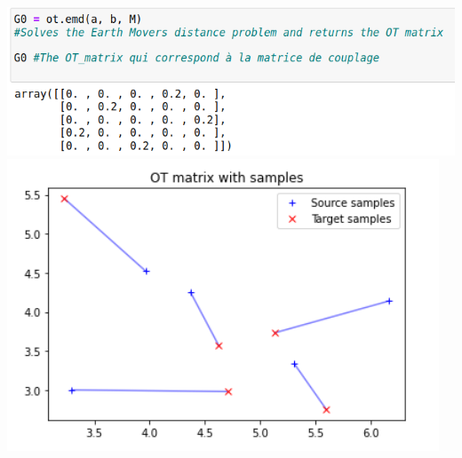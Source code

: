 \documentclass{beamer}
\theoremstyle{definition}
\begin{document}
\begin{frame}
		\centering
		\includegraphics[scale= 0.45]{a7.png}
		\includegraphics[scale= 0.45]{a5.png}
\end{frame}
\end{document}
